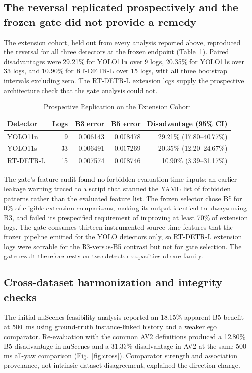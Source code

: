 \documentclass[journal]{IEEEtran}
\begin{document}
\subsection{The reversal replicated prospectively and the frozen gate did not provide a remedy}
The extension cohort, held out from every analysis reported above, reproduced the reversal for all three detectors at the frozen endpoint (Table~\ref{tab:extension}). Paired disadvantages were 29.21\% for YOLO11n over 9 logs, 20.35\% for YOLO11s over 33 logs, and 10.90\% for RT-DETR-L over 15 logs, with all three bootstrap intervals excluding zero. The RT-DETR-L extension logs supply the prospective architecture check that the gate analysis could not.

\begin{table}[!t]
\caption{Prospective Replication on the Extension Cohort}
\label{tab:extension}
\centering
\footnotesize
\begin{tabular}{@{}lrrrr@{}}
\toprule
Detector & Logs & B3 error & B5 error & Disadvantage (95\% CI) \\
\midrule
YOLO11n & 9 & 0.006143 & 0.008478 & 29.21\% (17.80--40.77\%) \\
YOLO11s & 33 & 0.006491 & 0.007269 & 20.35\% (12.20--24.67\%) \\
RT-DETR-L & 15 & 0.007574 & 0.008746 & 10.90\% (3.39--31.17\%) \\
\bottomrule
\end{tabular}
\end{table}

The gate's feature audit found no forbidden evaluation-time inputs; an earlier leakage warning traced to a script that scanned the YAML list of forbidden patterns rather than the evaluated feature list. The frozen selector chose B5 for 0\% of eligible extension comparisons, making its output identical to always using B3, and failed its prespecified requirement of improving at least 70\% of extension logs. The gate consumes thirteen instrumented source-time features that the frozen pipeline emitted for the YOLO detectors only, so RT-DETR-L extension logs were scorable for the B3-versus-B5 contrast but not for gate selection. The gate result therefore rests on two detector capacities of one family.

\subsection{Cross-dataset harmonization and integrity checks}
The initial nuScenes feasibility analysis reported an 18.15\% apparent B5 benefit at 500~ms using ground-truth instance-linked history and a weaker ego comparator. Re-evaluation with the common AV2 definitions produced a 12.80\% B5 disadvantage in nuScenes and a 31.33\% disadvantage in AV2 at the same 500-ms all-yaw comparison (Fig.~\ref{fig:cross}). Comparator strength and association provenance, not intrinsic dataset disagreement, explained the direction change.
\end{document}
